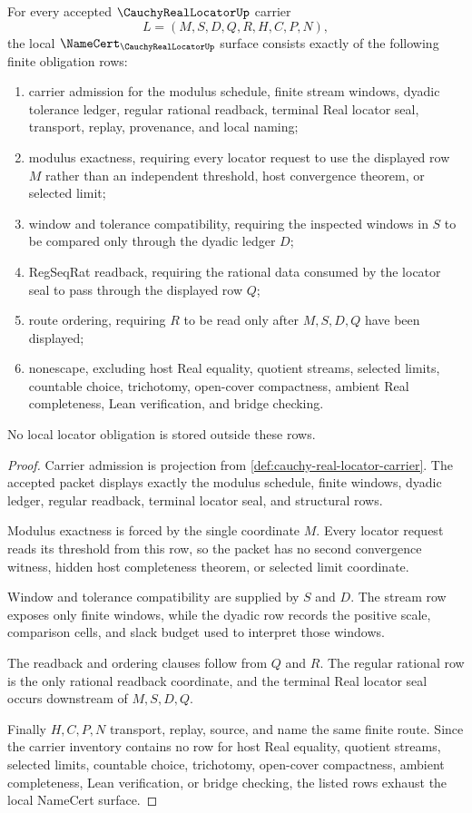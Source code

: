 \begin{theorem}
\label{thm:cauchy-real-locator-namecert-obligations}
For every accepted $\CauchyRealLocatorUp$ carrier
$$
L=(M,S,D,Q,R,H,C,P,N),
$$
the local $\NameCert_{\CauchyRealLocatorUp}$ surface consists exactly of the following finite obligation rows:
\begin{enumerate}
\item carrier admission for the modulus schedule, finite stream windows, dyadic tolerance ledger, regular rational readback, terminal Real locator seal, transport, replay, provenance, and local naming;
\item modulus exactness, requiring every locator request to use the displayed row $M$ rather than an independent threshold, host convergence theorem, or selected limit;
\item window and tolerance compatibility, requiring the inspected windows in $S$ to be compared only through the dyadic ledger $D$;
\item RegSeqRat readback, requiring the rational data consumed by the locator seal to pass through the displayed row $Q$;
\item route ordering, requiring $R$ to be read only after $M,S,D,Q$ have been displayed;
\item nonescape, excluding host Real equality, quotient streams, selected limits, countable choice, trichotomy, open-cover compactness, ambient Real completeness, Lean verification, and bridge checking.
\end{enumerate}
No local locator obligation is stored outside these rows.
\end{theorem}
\begin{proof}
Carrier admission is projection from \autoref{def:cauchy-real-locator-carrier}. The accepted packet displays exactly the modulus schedule, finite windows, dyadic ledger, regular readback, terminal locator seal, and structural rows.

Modulus exactness is forced by the single coordinate $M$. Every locator request reads its threshold from this row, so the packet has no second convergence witness, hidden host completeness theorem, or selected limit coordinate.

Window and tolerance compatibility are supplied by $S$ and $D$. The stream row exposes only finite windows, while the dyadic row records the positive scale, comparison cells, and slack budget used to interpret those windows.

The readback and ordering clauses follow from $Q$ and $R$. The regular rational row is the only rational readback coordinate, and the terminal Real locator seal occurs downstream of $M,S,D,Q$.

Finally $H,C,P,N$ transport, replay, source, and name the same finite route. Since the carrier inventory contains no row for host Real equality, quotient streams, selected limits, countable choice, trichotomy, open-cover compactness, ambient completeness, Lean verification, or bridge checking, the listed rows exhaust the local NameCert surface.
\end{proof}

